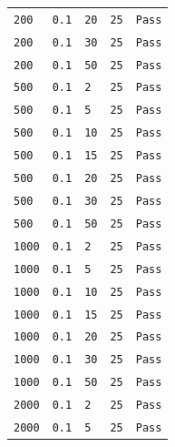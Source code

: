 \documentclass[11pt]{article}
\begin{document}
\begin{appendices}
{\begin{center}
\begin{tabular}{|l|l|l|l|l|}
\texttt{200} & \texttt{0.1} & \texttt{20} & \texttt{25} & {\color{forestgreen!70}\texttt{Pass}}\\
\texttt{200} & \texttt{0.1} & \texttt{30} & \texttt{25} & {\color{forestgreen!70}\texttt{Pass}}\\
\texttt{200} & \texttt{0.1} & \texttt{50} & \texttt{25} & {\color{forestgreen!70}\texttt{Pass}}\\
\texttt{500} & \texttt{0.1} & \texttt{2} & \texttt{25} & {\color{forestgreen!70}\texttt{Pass}}\\
\texttt{500} & \texttt{0.1} & \texttt{5} & \texttt{25} & {\color{forestgreen!70}\texttt{Pass}}\\
\texttt{500} & \texttt{0.1} & \texttt{10} & \texttt{25} & {\color{forestgreen!70}\texttt{Pass}}\\
\texttt{500} & \texttt{0.1} & \texttt{15} & \texttt{25} & {\color{forestgreen!70}\texttt{Pass}}\\
\texttt{500} & \texttt{0.1} & \texttt{20} & \texttt{25} & {\color{forestgreen!70}\texttt{Pass}}\\
\texttt{500} & \texttt{0.1} & \texttt{30} & \texttt{25} & {\color{forestgreen!70}\texttt{Pass}}\\
\texttt{500} & \texttt{0.1} & \texttt{50} & \texttt{25} & {\color{forestgreen!70}\texttt{Pass}}\\
\texttt{1000} & \texttt{0.1} & \texttt{2} & \texttt{25} & {\color{forestgreen!70}\texttt{Pass}}\\
\texttt{1000} & \texttt{0.1} & \texttt{5} & \texttt{25} & {\color{forestgreen!70}\texttt{Pass}}\\
\texttt{1000} & \texttt{0.1} & \texttt{10} & \texttt{25} & {\color{forestgreen!70}\texttt{Pass}}\\
\texttt{1000} & \texttt{0.1} & \texttt{15} & \texttt{25} & {\color{forestgreen!70}\texttt{Pass}}\\
\texttt{1000} & \texttt{0.1} & \texttt{20} & \texttt{25} & {\color{forestgreen!70}\texttt{Pass}}\\
\texttt{1000} & \texttt{0.1} & \texttt{30} & \texttt{25} & {\color{forestgreen!70}\texttt{Pass}}\\
\texttt{1000} & \texttt{0.1} & \texttt{50} & \texttt{25} & {\color{forestgreen!70}\texttt{Pass}}\\
\texttt{2000} & \texttt{0.1} & \texttt{2} & \texttt{25} & {\color{forestgreen!70}\texttt{Pass}}\\
\texttt{2000} & \texttt{0.1} & \texttt{5} & \texttt{25} & {\color{forestgreen!70}\texttt{Pass}}\\

\end{tabular}
\end{center}}
\end{appendices}
\end{document}
